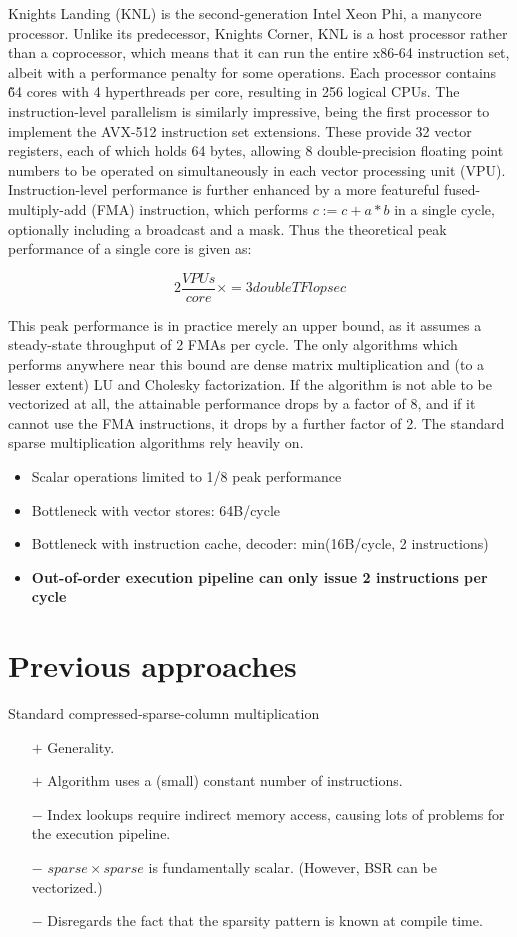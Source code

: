 Knights Landing (KNL) is the second-generation Intel Xeon Phi, a manycore processor. Unlike its predecessor, Knights Corner, KNL is a host processor rather than a coprocessor, which means that it can run the entire x86-64 instruction set, albeit with a performance penalty for some operations. Each processor contains \~64 cores with 4 hyperthreads per core, resulting in 256 logical CPUs. The instruction-level parallelism is similarly impressive, being the first processor to implement the AVX-512 instruction set extensions. These provide 32 vector registers, each of which holds 64 bytes, allowing 8 double-precision floating point numbers to be operated on simultaneously in each vector processing unit (VPU). Instruction-level performance is further enhanced by a more featureful fused-multiply-add (FMA) instruction, which performs $c := c + a*b$ in a single cycle, optionally including a broadcast and a mask. Thus the theoretical peak performance of a single core is given as:

\[2 \frac{VPUs}{core} \times  = 3 {double TFlop}{sec}\]

This peak performance is in practice merely an upper bound, as it assumes a steady-state throughput of 2 FMAs per cycle. The only algorithms which performs anywhere near this bound are dense matrix multiplication and (to a lesser extent) LU and Cholesky factorization. If the algorithm is not able to be vectorized at all, the attainable performance drops by a factor of 8, and if it cannot use the FMA instructions, it drops by a further factor of 2. The standard sparse multiplication algorithms rely heavily on. 

\begin{itemize}
    \item Scalar operations limited to 1/8 peak performance
    \item Bottleneck with vector stores: 64B/cycle
    \item Bottleneck with instruction cache, decoder: min(16B/cycle, 2 instructions)
    \item \textbf{Out-of-order execution pipeline can only issue 2 instructions per cycle}
\end{itemize}

\section{Previous approaches}

  Standard compressed-sparse-column multiplication
    \begin{itemize}
      \item[$+$] Generality.
      \item[$+$] Algorithm uses a (small) constant number of instructions.
      \item[$-$] Index lookups require indirect memory access, causing lots of problems for the execution pipeline.
      \item[$-$] $sparse \times sparse$ is fundamentally scalar. (However, BSR can be vectorized.)
      \item[$-$] Disregards the fact that the sparsity pattern is known at compile time.
    \end{itemize}

